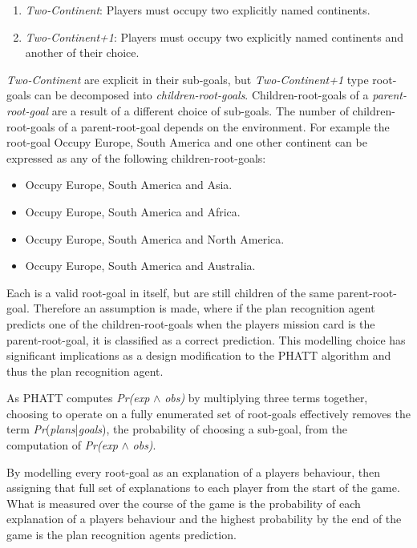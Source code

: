 \documentclass[parskip]{cs4rep}
\begin{document}
\begin{enumerate}
\item
\textit{Two-Continent}: Players must occupy two explicitly named continents.
\item
\textit{Two-Continent+1}: Players must occupy two explicitly named continents and another of their choice.
\end{enumerate}

\textit{Two-Continent} are explicit in their sub-goals, but \textit{Two-Continent+1} type root-goals can be decomposed into \textit{children-root-goals}. Children-root-goals of a \textit{parent-root-goal} are a result of a different choice of sub-goals. The number of children-root-goals of a parent-root-goal depends on the environment. For example the root-goal Occupy Europe, South America and one other continent can be expressed as any of the following children-root-goals:

\begin{itemize}
\item
Occupy Europe, South America and Asia.
\item
Occupy Europe, South America and Africa.
\item
Occupy Europe, South America and North America.
\item
Occupy Europe, South America and Australia.\newline
\end{itemize}

Each is a valid root-goal in itself, but are still children of the same parent-root-goal. Therefore an assumption is made, where if the plan recognition agent predicts one of the children-root-goals when the players mission card is the parent-root-goal, it is classified as a correct prediction. This modelling choice has significant implications as a design modification to the PHATT algorithm and thus the plan recognition agent.

As PHATT computes \textit{Pr(exp} $\wedge$ \textit{obs)} by multiplying three terms together, choosing to operate on a fully enumerated set of root-goals effectively removes the term \textit{Pr}(\textit{plans}|\textit{goals}), the probability of choosing a sub-goal, from the computation of \textit{Pr(exp} $\wedge$ \textit{obs)}.

By modelling every root-goal as an explanation of a players behaviour, then assigning that full set of explanations to each player from the start of the game. What is measured over the course of the game is the probability of each explanation of a players behaviour and the highest probability by the end of the game is the plan recognition agents prediction.
\end{document}
